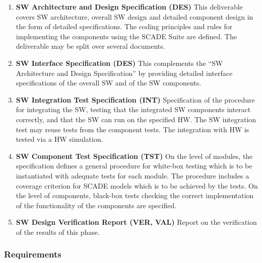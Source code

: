 \documentclass{template/openetcs_article}
\begin{document}
\begin{enumerate}
\item \textbf{SW Architecture and Design Specification (DES)} This
  deliverable covers SW architecture, overall SW design and detailed
  component design in the form of detailed specifications. The coding
  principles and rules for implementing the components using the SCADE
  Suite are defined.  The deliverable may be split over several
  documents.
\item \textbf{SW Interface Specification (DES)} This complements the
  ``SW Architecture and Design Specification'' by providing detailed
  interface specifications of the overall SW and of the SW components. 
\item \textbf{SW Integration Test Specification (INT)} Specification
  of the procedure for integrating the SW, testing that the integrated
  SW components interact correctly, and that the SW can run on the
  specified HW. The SW integration test may reuse tests from the
  component tests. The integration with HW is tested via a HW
  simulation.
\item \textbf{SW Component Test Specification (TST)} On the level of
  modules, the specification defines a general procedure for white-box
  testing which is to be instantiated with adequate tests for each
  module. The procedure includes a coverage criterion for SCADE models
  which is to be achieved by the tests. On the level of components, black-box
  tests checking the correct implementation of the functionality of
  the components are specified.
\item \textbf{SW Design Verification Report (VER, VAL)}
  Report on the verification of the results of this phase.
\end{enumerate}

\subsubsection{Requirements}
\label{sec:4-requirements}
\end{document}
